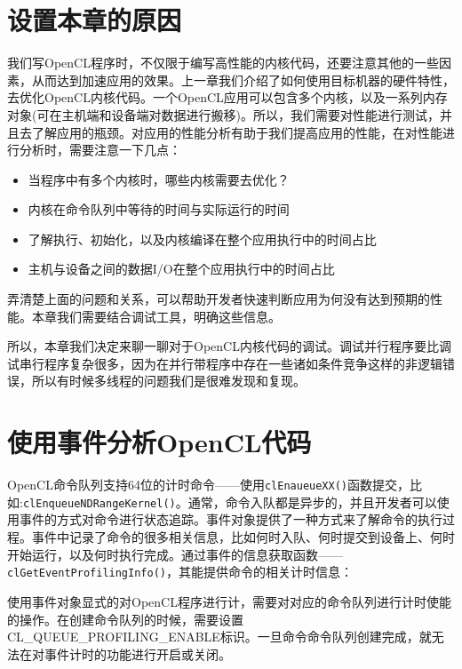 

\section{设置本章的原因}

我们写OpenCL程序时，不仅限于编写高性能的内核代码，还要注意其他的一些因素，从而达到加速应用的效果。上一章我们介绍了如何使用目标机器的硬件特性，去优化OpenCL内核代码。一个OpenCL应用可以包含多个内核，以及一系列内存对象(可在主机端和设备端对数据进行搬移)。所以，我们需要对性能进行测试，并且去了解应用的瓶颈。对应用的性能分析有助于我们提高应用的性能，在对性能进行分析时，需要注意一下几点：

\begin{itemize}
\item 当程序中有多个内核时，哪些内核需要去优化？
\item 内核在命令队列中等待的时间与实际运行的时间
\item 了解执行、初始化，以及内核编译在整个应用执行中的时间占比
\item 主机与设备之间的数据I/O在整个应用执行中的时间占比
\end{itemize}

弄清楚上面的问题和关系，可以帮助开发者快速判断应用为何没有达到预期的性能。本章我们需要结合调试工具，明确这些信息。

所以，本章我们决定来聊一聊对于OpenCL内核代码的调试。调试并行程序要比调试串行程序复杂很多，因为在并行带程序中存在一些诸如条件竞争这样的非逻辑错误，所以有时候多线程的问题我们是很难发现和复现。



\section{使用事件分析OpenCL代码}

OpenCL命令队列支持64位的计时命令——使用\texttt{clEnaueueXX()}函数提交，比如:\texttt{clEnqueueNDRangeKernel()}。通常，命令入队都是异步的，并且开发者可以使用事件的方式对命令进行状态追踪。事件对象提供了一种方式来了解命令的执行过程。事件中记录了命令的很多相关信息，比如何时入队、何时提交到设备上、何时开始运行，以及何时执行完成。通过事件的信息获取函数——\texttt{clGetEventProfilingInfo()}，其能提供命令的相关计时信息：

使用事件对象显式的对OpenCL程序进行计，需要对对应的命令队列进行计时使能的操作。在创建命令队列的时候，需要设置CL\_\allowbreak{}QUEUE\_\allowbreak{}PROFILING\_\allowbreak{}ENABLE标识。一旦命令命令队列创建完成，就无法在对事件计时的功能进行开启或关闭。

